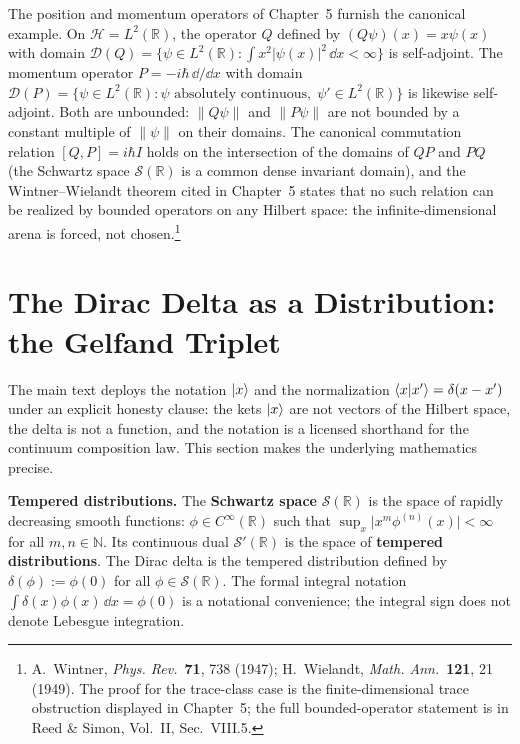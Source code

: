 The position and momentum operators of Chapter~5 furnish the canonical example. On $\mathcal{H} = L^2(\mathbb{R})$, the operator $Q$ defined by $(Q\psi)(x) = x\psi(x)$ with domain $\mathcal{D}(Q) = \{\psi \in L^2(\mathbb{R}) : \int x^2\lvert\psi(x)\rvert^2\,\dd x < \infty\}$ is self-adjoint. The momentum operator $P = -i\hbar\,\dd/\dd x$ with domain $\mathcal{D}(P) = \{\psi \in L^2(\mathbb{R}) : \psi \text{ absolutely continuous},\; \psi' \in L^2(\mathbb{R})\}$ is likewise self-adjoint. Both are unbounded: $\|Q\psi\|$ and $\|P\psi\|$ are not bounded by a constant multiple of $\|\psi\|$ on their domains. The canonical commutation relation $[Q,P] = i\hbar I$ holds on the intersection of the domains of $QP$ and $PQ$ (the Schwartz space $\mathcal{S}(\mathbb{R})$ is a common dense invariant domain), and the Wintner--Wielandt theorem cited in Chapter~5 states that no such relation can be realized by bounded operators on any Hilbert space: the infinite-dimensional arena is forced, not chosen.\footnote{A.~Wintner, \emph{Phys. Rev.}~\textbf{71}, 738 (1947); H.~Wielandt, \emph{Math. Ann.}~\textbf{121}, 21 (1949). The proof for the trace-class case is the finite-dimensional trace obstruction displayed in Chapter~5; the full bounded-operator statement is in Reed \& Simon, Vol.~II, Sec.~VIII.5.}

\section{The Dirac Delta as a Distribution: the Gelfand Triplet}
\label{sec:appendix-delta}

The main text deploys the notation $\ket{x}$ and the normalization $\braket{x|x'} = \delta(x - x')$ under an explicit honesty clause: the kets $\ket{x}$ are not vectors of the Hilbert space, the delta is not a function, and the notation is a licensed shorthand for the continuum composition law. This section makes the underlying mathematics precise.

\medskip\noindent\textbf{Tempered distributions.} The \textbf{Schwartz space} $\mathcal{S}(\mathbb{R})$ is the space of rapidly decreasing smooth functions: $\phi \in C^\infty(\mathbb{R})$ such that $\sup_x \lvert x^m \phi^{(n)}(x)\rvert < \infty$ for all $m,n \in \mathbb{N}$. Its continuous dual $\mathcal{S}'(\mathbb{R})$ is the space of \textbf{tempered distributions}. The Dirac delta is the tempered distribution defined by $\delta(\phi) := \phi(0)$ for all $\phi \in \mathcal{S}(\mathbb{R})$. The formal integral notation $\int \delta(x)\phi(x)\,\dd x = \phi(0)$ is a notational convenience; the integral sign does not denote Lebesgue integration.

